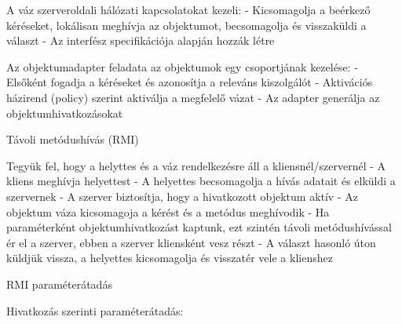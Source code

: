 \documentclass[12pt]{article}
\begin{document}
\begin{description}
                                                                    \item A váz szerveroldali hálózati kapcsolatokat kezeli:
                                                                        - Kicsomagolja a beérkező kéréseket, lokálisan meghívja az objektumot, becsomagolja és visszaküldi a választ
                                                                        - Az interfész specifikációja alapján hozzák létre
                                                                    \item Az objektumadapter feladata az objektumok egy csoportjának kezelése:
                                                                        - Elsőként fogadja a kéréseket és azonosítja a releváns kiszolgálót
                                                                        - Aktivációs házirend (policy) szerint aktiválja  a megfelelő vázat
                                                                        - Az adapter generálja az objektumhivatkozásokat 
                                                                    \item  Távoli metódushívás (RMI)
                                                                    \item Tegyük fel, hogy a helyttes és a váz rendelkezésre áll a kliensnél/szervernél
                                                                        - A kliens meghívja helyettest
                                                                        - A helyettes becsomagolja a hívás adatait és elküldi a szervernek
                                                                        - A szerver biztosítja, hogy a hivatkozott objektum aktív
                                                                        - Az objektum váza kicsomagoja a kérést és a metódus meghívodik
                                                                        - Ha paraméterként objektumhivatkozást kaptunk, ezt szintén távoli metódushívással ér el a szerver,
                                                                        ebben a szerver kliensként vesz részt
                                                                        - A választ hasonló úton küldjük vissza, a helyettes kicsomagolja és visszatér vele a klienshez
                                                                    \item  RMI paraméterátadás
                                                                    \item Hivatkozás szerinti paraméterátadás:

\end{description}
\end{document}
